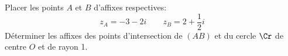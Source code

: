 \begin{exercice}

 Placer les points $A$ et $B$ d'affixes respectives:
\[ z_A=-3-2i \qquad z_B=2+\frac12i \]
D\'eterminer les affixes des points d'intersection de $(AB)$ et du cercle $\Cr$ de
centre $O$ et de rayon 1.
\end{exercice}
